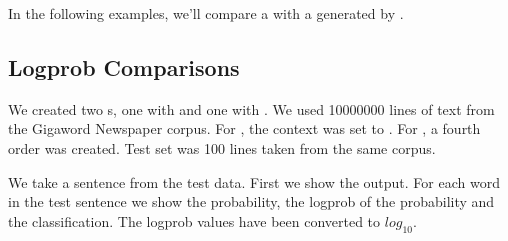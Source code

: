 \documentclass[a4paper,10pt,twoside]{report}
\begin{document}
In the following examples, we'll compare a \mb{} \lm{} with a \lm{}
generated by \srilm{}. 

\subsection{Logprob Comparisons}

We created two \lm{}s, one with \wopr{} and one with \srilm{}. We used
\num{10000000} lines of text from the Gigaword Newspaper corpus. For
\wopr{}, the context was set to . For \srilm{}, a fourth
order \lm{} was created. Test set was \num{100} lines taken from
the same corpus.

We take a sentence from the test data. First we show the \wopr{}
output. For each word in the test sentence we show the probability,
the logprob of the probability and the \wopr{} classification. The
logprob values have been converted to $log_{10}$.
\end{document}
